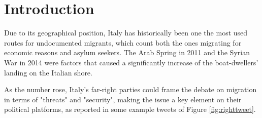 \documentclass[sigchi]{acmart}
\begin{document}
%


%
\maketitle

\section{Introduction}
Due to its geographical position, Italy has historically been one the most used routes for undocumented migrants, which count both the ones migrating for economic reasons and asylum seekers. 
The Arab Spring in 2011 and the Syrian War in 2014 were factors that caused a significantly increase of the boat-dwellers' landing on the Italian shore\cite{ispi}.%


As the number rose, Italy's far-right parties could frame the debate on migration in terms of "threats" and "security"\cite{iai}, making the issue a key element on their political platforms, as reported in some example tweets\cite{melonitweet}\cite{salvinitweet} of Figure \ref{fig:righttweet}. 
\end{document}
